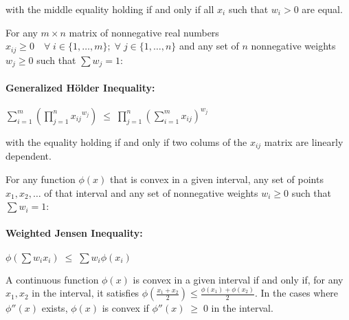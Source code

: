 \documentclass[11pt]{article}
\begin{document}
        with the middle equality holding if and only if all $x_i$ such that $w_i > 0$ are equal. \bigskip

    \hrulefill \bigskip

        For any $m\times n$ matrix of nonnegative real numbers $x_{ij} \geq 0\quad \forall\;i\in\{1,\dots, m\};\; \forall\;j\in\{1, \dots, n\}$ and any set of $n$ nonnegative weights $w_j \geq 0$ such that $\sum w_j = 1$:
        
        \paragraph{Generalized H\"older Inequality:} $\displaystyle \boxed{\sum_{i=1}^{m}{\left(\prod_{j=1}^{n} {x_{ij}}^{w_j}\right)} \;\leq\; \prod_{j=1}^{n}\left(\sum_{i=1}^{m} x_{ij}\right)^{w_j}}$ \bigskip

        with the equality holding if and only if two colums of the $x_{ij}$ matrix are linearly dependent. \bigskip

    \hrulefill \bigskip

        For any function $\phi(x)$ that is convex in a given interval, any set of points $x_1, x_2, \dots$ of that interval and any set of nonnegative weights $w_i \geq 0$ such that $\sum w_i = 1$:  

        \paragraph{Weighted Jensen Inequality:} $\displaystyle \boxed{\phi\left(\sum w_i x_i\right) \;\leq\; \sum w_i \phi(x_i)}$ \bigskip

        A continuous function $\phi(x)$ is convex in a given interval if and only if, for any $x_1, x_2$ in the interval, it satisfies $\phi\left(\tfrac{x_1+x_2}{2}\right) \leq \tfrac{\phi(x_1)+\phi(x_2)}{2}$. In the cases where $\phi''(x)$ exists, $\phi(x)$ is convex if $\phi''(x) \;\geq\;0$ in the interval.
\end{document}
